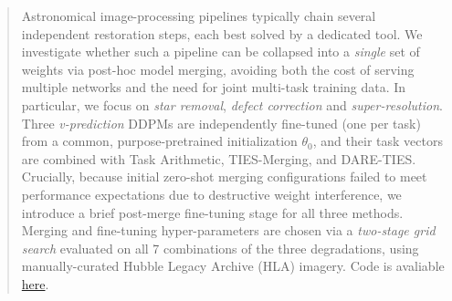 \documentclass{article}
\begin{document}

\printAffiliationsAndNotice{}

\begin{abstract}
	Astronomical image-processing pipelines typically chain several independent restoration steps, each best solved by a dedicated tool. We investigate whether such a pipeline can be collapsed into a \emph{single} set of weights via post-hoc model merging, avoiding both the cost of serving multiple networks and the need for joint multi-task training data. In particular, we focus on \emph{star removal}, \emph{defect correction} and \emph{super-resolution}. Three \textit{v-prediction} DDPMs are independently fine-tuned (one per task) from a common, purpose-pretrained initialization $\theta_0$, and their task vectors are combined with Task Arithmetic, TIES-Merging, and DARE-TIES. Crucially, because initial zero-shot merging configurations failed to meet performance expectations due to destructive weight interference, we introduce a brief post-merge fine-tuning stage for all three methods. Merging and fine-tuning hyper-parameters are chosen via a \emph{two-stage grid search} evaluated on all 7 combinations of the three degradations, using manually-curated Hubble Legacy Archive (HLA) imagery. Code is avaliable \href{https://github.com/aflaag/clearsky}{here}.
\end{abstract}
\end{document}
